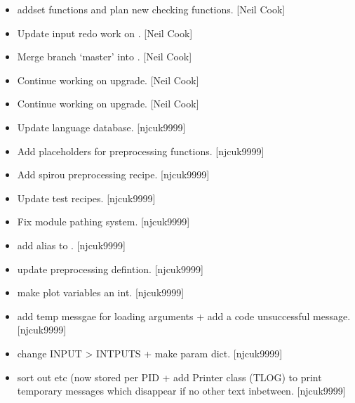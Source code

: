 \documentclass[a4paper,10pt,english]{report}
\begin{document}
\begin{itemize}
\item {} 
 \sphinxhyphen{} addset functions and plan new checking functions. {[}Neil
Cook{]}

\item {} 
Update input redo \sphinxhyphen{} work on . {[}Neil Cook{]}

\item {} 
Merge branch ‘master’ into . {[}Neil Cook{]}

\item {} 
Continue working on upgrade. {[}Neil Cook{]}

\item {} 
Continue working on upgrade. {[}Neil Cook{]}

\item {} 
Update language database. {[}njcuk9999{]}

\item {} 
Add placeholders for preprocessing functions. {[}njcuk9999{]}

\item {} 
Add spirou preprocessing recipe. {[}njcuk9999{]}

\item {} 
Update test recipes. {[}njcuk9999{]}

\item {} 
Fix module pathing system. {[}njcuk9999{]}

\item {} 
 \sphinxhyphen{} add alias to . {[}njcuk9999{]}

\item {} 
 \sphinxhyphen{} update preprocessing defintion. {[}njcuk9999{]}

\item {} 
 \sphinxhyphen{} make plot variables an int. {[}njcuk9999{]}

\item {} 
 \sphinxhyphen{} add temp messgae for loading arguments + add a code
unsuccessful message. {[}njcuk9999{]}

\item {} 
 \sphinxhyphen{} change INPUT \textendash{}\textgreater{} INTPUTS + make param dict.
{[}njcuk9999{]}

\item {} 
 \sphinxhyphen{} sort out  etc (now stored per PID + add
Printer class (TLOG) to print temporary messages which disappear if no
other text inbetween. {[}njcuk9999{]}


\end{itemize}
\end{document}

